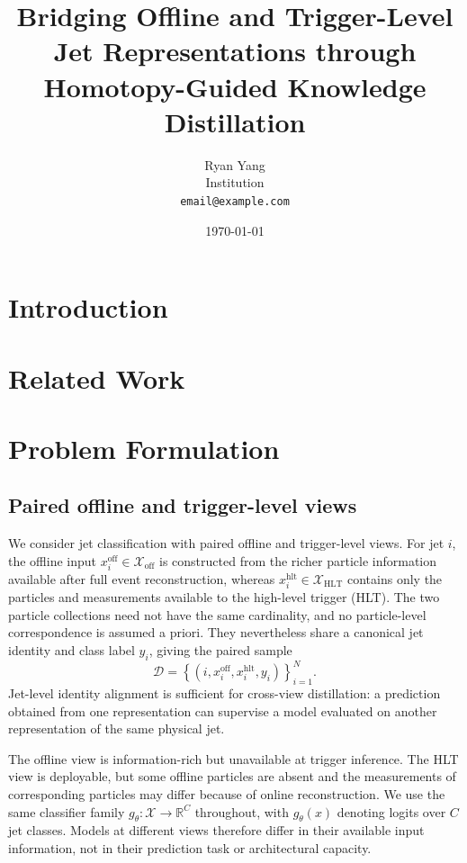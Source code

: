 \documentclass[11pt]{article}
\title{Bridging Offline and Trigger-Level Jet Representations
       through Homotopy-Guided Knowledge Distillation}
\author{
  Ryan Yang \\
  \small Institution \\
  \small \texttt{email@example.com}
}
\date{\today}
\newcommand{\xoff}{\mathcal{X}_{\mathrm{off}}}
\newcommand{\xhlt}{\mathcal{X}_{\mathrm{HLT}}}
\begin{document}
\maketitle

\begin{abstract}
\end{abstract}

\section{Introduction}
\label{sec:introduction}

\section{Related Work}
\label{sec:related-work}

\section{Problem Formulation}
\label{sec:problem}

\subsection{Paired offline and trigger-level views}

We consider jet classification with paired offline and trigger-level views.
For jet $i$, the offline input $x_i^{\mathrm{off}}\in\xoff$ is constructed
from the richer particle information available after full event
reconstruction, whereas $x_i^{\mathrm{hlt}}\in\xhlt$ contains only the
particles and measurements available to the high-level trigger (HLT).  The
two particle collections need not have the same cardinality, and no
particle-level correspondence is assumed a priori.  They nevertheless share
a canonical jet identity and class label $y_i$, giving the paired sample
\begin{equation}
    \mathcal{D}
    = \left\{
        \left(i,x_i^{\mathrm{off}},x_i^{\mathrm{hlt}},y_i\right)
      \right\}_{i=1}^{N}.
    \label{eq:paired-data}
\end{equation}
Jet-level identity alignment is sufficient for cross-view distillation: a
prediction obtained from one representation can supervise a model evaluated
on another representation of the same physical jet.

The offline view is information-rich but unavailable at trigger inference.
The HLT view is deployable, but some offline particles are absent and the
measurements of corresponding particles may differ because of online
reconstruction.  We use the same classifier family
$g_{\theta}:\mathcal{X}\rightarrow\mathbb{R}^{C}$ throughout, with
$g_{\theta}(x)$ denoting logits over $C$ jet classes.  Models at different
views therefore differ in their available input information, not in their
prediction task or architectural capacity.
\end{document}
